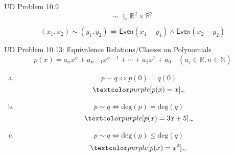 \begin{frame}{}
  \begin{exampleblock}{UD Problem 10.9}
    \[
      \sim\; \subseteq \mathbb{R}^2 \times \mathbb{R}^2
    \]

    \[
      (x_1, x_2) \sim (y_1, y_2) \iff \textsf{Even}(x_1 - y_1) \land \textsf{Even}(x_2 - y_2)
    \]

    \begin{center}
    \end{center}
  \end{exampleblock}

  \pause
  \vspace{0.60cm}
  \begin{center}
  \end{center}
\end{frame}

\begin{frame}{}
  \begin{exampleblock}{UD Problem 10.13: Equivalence Relations/Classes on Polynomials}
    \[
      p(x) = a_n x^n + a_{n-1} x^{n-1} + \cdots + a_1 x^1 + a_0 \quad (a_j \in \mathbb{R}, n \in \mathbb{N})
    \]

    \begin{enumerate}[(a)]
      \item 
	\[
	  p \sim q \iff p(0) = q(0)
	\]
	\[
	  \purple{[p(x) = x]_{\sim}}
	\]
      \item 
	\[
	  p \sim q \iff \text{deg}(p) = \text{deg}(q)
	\]
	\[
	  \purple{[p(x) = 3x + 5]_{\sim}}
	\]
      \item 
	\[
	  p \sim q \iff \text{deg}(p) \le \text{deg}(q)
	\]
        \[
	  \purple{[p(x) = x^2]_{\sim}}
	\]
    \end{enumerate}
  \end{exampleblock}
\end{frame}
